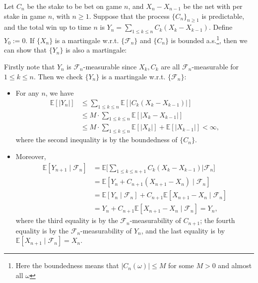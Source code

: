 \begin{example}\label{Exp:4:2}
Let $C_n$ be the stake to be bet on game $n$, and $X_n-X_{n-1}$ be the net with per stake in game $n$, with $n\ge1$.
Suppose that the process $\{C_n\}_{n\ge1}$ is predictable, and the total win up to time $n$ is 
$Y_n = \sum_{1\le k\le n}C_k(X_k - X_{k-1})$.
Define $Y_0:=0$.
If $\{X_n\}$ is a martingale w.r.t. $\{\mathcal{F}_n\}$ and $\{C_n\}$ is bounded a.s.\footnote{
Here the boundedness means that $|C_n(\omega)|\le M$ for some $M>0$ and almost all $\omega$
}, then we can show that $\{Y_n\}$ is also a martingale:

Firstly note that $Y_n$ is $\mathcal{F}_n$-measurable since $X_k,C_k$ are all $\mathcal{F}_n$-measurable for $1\le k\le n$.
Then we check $\{Y_n\}$ is a martingale w.r.t. $\{\mathcal{F}_n\}$:
\begin{itemize}
\item
For any $n$, we have
\begin{align*}
\mathbb{E}[|Y_n|]&\le \sum_{1\le k\le n}\mathbb{E}[|C_k(X_k - X_{k-1})|]\\
&\le M\cdot \sum_{1\le k\le n}\mathbb{E}[|X_k - X_{k-1}|]\\
&\le M\cdot \sum_{1\le k\le n}\mathbb{E}[|X_k|] + \mathbb{E}[|X_{k-1}|]<\infty,
\end{align*}
where the second inequality is by the boundedness of $\{C_n\}$.
\item
Moreover, 
\begin{align*}
\mathbb{E}[Y_{n+1}\mid\mathcal{F}_n]&=\mathbb{E}\bigg[
\sum_{1\le k\le n+1}C_k(X_k - X_{k-1})\bigg|\mathcal{F}_n
\bigg]\\
&=\mathbb{E}[Y_n + C_{n+1}(X_{n+1} - X_n)\mid\mathcal{F}_n]\\
&=\mathbb{E}[Y_n\mid\mathcal{F}_n] + C_{n+1}\mathbb{E}[X_{n+1} - X_n\mid\mathcal{F}_n]\\
&=Y_n + C_{n+1}\mathbb{E}[X_{n+1} - X_n\mid\mathcal{F}_n]=Y_n,
\end{align*}
where the third equality is by the $\mathcal{F}_n$-measurability of $C_{n+1}$;
the fourth equality is by the $\mathcal{F}_n$-measurability of $Y_n$,
and the last equality is by $\mathbb{E}[X_{n+1}\mid\mathcal{F}_n]=X_n$.
\end{itemize}


\end{example}

